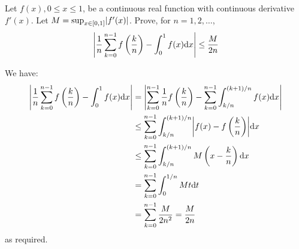 \documentclass[a4paper, 12pt]{article}
\begin{document}
\begin{problem} 
Let $f(x), 0 \leq x \leq 1$, be a continuous real function with continuous derivative $f'(x)$. Let $M = \sup_{x \in [0, 1]} \abs{f'(x)}$. Prove, for $n = 1, 2, \ldots$, \begin{equation*}
\abs*{\frac{1}{n}\sum_{k=0}^{n-1} f\left(\frac{k}{n}\right) - \int_{0}^{1} f(x) \dx} \leq \frac{M}{2n}
\end{equation*}
\end{problem}
\begin{solution}
    We have:
    \begin{align*}
        \abs*{\frac{1}{n}\sum_{k=0}^{n-1} f\left(\frac{k}{n}\right) - \int_{0}^{1} f(x) \dx} &= \abs*{\sum_{k=0}^{n-1} \frac{1}{n} f\left(\frac{k}{n}\right) - \sum_{k=0}^{n-1} \int_{k/n}^{(k+1)/n} f(x) \dx} \\
        &\leq \sum_{k=0}^{n-1} \int_{k/n}^{(k+1)/n} \abs*{f(x) - f\left(\frac{k}{n}\right)} \dx\\
        &\leq \sum_{k=0}^{n-1} \int_{k/n}^{(k+1)/n} M\left(x - \frac{k}{n}\right) \dx \\
        &=\sum_{k=0}^{n-1} \int_{0}^{1/n} M t \dt \\
        &= \sum_{k=0}^{n-1} \frac{M}{2n^2} = \frac{M}{2n}
    \end{align*}
    as required.
\end{solution}
\end{document}
